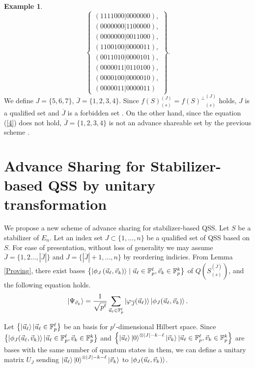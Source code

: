\documentclass[11pt,a4paper]{article}
\theoremstyle{definition}
\newtheorem{example}{Example}
\begin{document}
\begin{example}
    \begin{equation}
        \left\{
            \begin{array}{c}
                (1111000|0000000),\\
                (0000000|1100000),\\
                (0000000|0011000),\\
                (1100100|0000011),\\
                (0011010|0000101),\\
                (0000011|0110100),\\
                (0000100|0000010),\\
                (0000011|0000011)
            \end{array}
        \right\}.
    \end{equation}
    We define $J=\{5,6,7\}$, $\overline{J}=\{1,2,3,4\}$.
    Since 
    $f(S)_{(s)}^{(J)} = {f(S)^\perp}_{(s)}^{(J)}$ holds, $J$ is a qualified set and $\overline{J}$ is a forbidden set \cite{Unitary_reconstruction_Matsumoto_2017}.
    On the other hand, since the equation (\ref{4}) does not hold, 
    $\overline{J}=\{1,2,3,4\}$ is not an advance shareable set by the previous scheme \cite{AdvanceSharing_Shibata}. 
\end{example}

\section{Advance Sharing for Stabilizer-based QSS by unitary transformation}\label{unitary_advance_sharing}
We propose a new scheme of advance sharing for stabilizer-based QSS.
Let $S$ be a stabilizer of $E_n$.
Let an index set $J\subset\{1,\dots,n\}$ be a qualified set of QSS based on $S$.
For ease of presentation, without loss of generality we may assume $\overline{J} = \{1,2\dots,|\overline{J}|\}$ and $J =\{|\overline{J}|+1,\dots,n\}$ by reordering indicies.
From Lemma \ref{Proving}, 
there exist  bases $\left\{\ket{\phi_J\left(\vec{u}_\ell, \vec{v}_k\right)} \mid \vec{u}_\ell \in \mathbb{F}_p^\ell, \vec{v}_k \in \mathbb{F}_p^k\right\}$ of 
$Q\left(S_{(s)}^{(\overline{J})}\right)$, and the following equation holds.    
\begin{equation}
    \ket{\Psi_{\vec{v}_k}} = \frac{1}{\sqrt{p^\ell}}\sum_{\vec{u}_\ell\in\mathbb{F}_p^\ell}\ket{\varphi_{\overline{J}}(\vec{u}_\ell)}\ket{\phi_J(\vec{u}_\ell,\vec{v}_k)}.
\end{equation}

Let $\left\{ \ket{\vec{u}_\ell}|\vec{u}_\ell\in \mathbb{F}_p^\ell\right\}$ be an  basis for 
$p^\ell$-dimensional Hilbert space.
Since $\left\{\ket{\phi_J(\vec{u}_\ell,\vec{v}_k)}|\vec{u}_\ell\in\mathbb{F}_p^\ell,\vec{v}_k\in\mathbb{F}_p^k\right\}$ and 
$\left\{ \ket{\vec{u}_\ell}\ket{0}^{\otimes |J|-k-\ell}\ket{\vec{v}_k}|\vec{u}_\ell\in \mathbb{F}_p^\ell,\vec{v}_k\in \mathbb{F}_p^k\right\}$
are  bases with the same number of quantum states in them, we can define a unitary matrix $U_J$ sending $\ket{\vec{u}_\ell}\ket{0}^{\otimes |J|-k-\ell}\ket{\vec{v}_k}$ to $\ket{\phi_J(\vec{u}_\ell,\vec{v}_k)}$.
\end{document}
